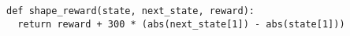 \begin{lstlisting}[style=codestyle, basicstyle=\ttfamily\footnotesize, caption={Mountain Car reward shaping}, label=lst:reward_shaping]
def shape_reward(state, next_state, reward):
  return reward + 300 * (abs(next_state[1]) - abs(state[1]))
\end{lstlisting}
